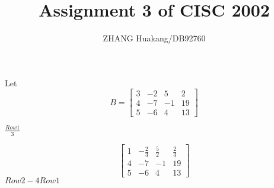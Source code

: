 \documentclass{article}
\title{Assignment 3 of CISC 2002}
\author{ZHANG Huakang/DB92760}
\begin{document}
    \maketitle
    \section{}
        \subsection{}
            Let $$B=\begin{bmatrix}
                3&-2&5&2\\
                4&-7&-1&19\\
                5&-6&4&13
            \end{bmatrix}$$

            $\frac{Row 1}{3}$

           $$\begin{bmatrix}
            1&-\frac{2}{3}&\frac{5}{2}&\frac{2}{3}\\
            4&-7&-1&19\\
            5&-6&4&13
        \end{bmatrix}$$
            $Row 2- 4 Row 1$
            
\end{document}
